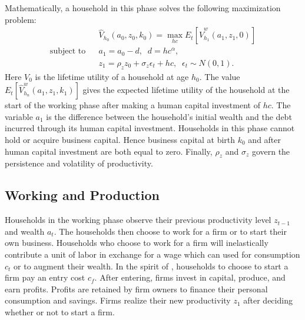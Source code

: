 \documentclass[11pt]{article}
\theoremstyle{definition}
\numberwithin{equation}{section}
\begin{document}
Mathematically, a household in this phase solves the following maximization problem:
\begin{eqnarray}
&&\hat{V}_{h_0}(a_0,z_0,k_0)=\max_{hc} E_t\left[ \hat{V}^w_{h_1}(a_1,z_1,0)\right] \\
\text{subject to} 	&& a_1 = a_0 - d, \;\; d = hc^\alpha, \\
					&& z_1 = \rho_z z_0 + \sigma_z\epsilon_t + hc, \;\; \epsilon_t\sim N(0,1).
\end{eqnarray}
Here $V_0$ is the lifetime utility of a household at age $h_0$. The value $E_t\left[ \hat{V}^w_{h_n}(a_1,z_1,k_1)\right]$ gives the expected lifetime utility of the household at the start of the working phase after making a human capital investment of $hc$. The variable $a_1$ is the difference between the household's initial wealth and the debt incurred through its human capital investment. Households in this phase cannot hold or acquire business capital. Hence business capital at birth $k_0$ and after human capital investment are both equal to zero. Finally, $\rho_z$ and $\sigma_z$ govern the persistence and volatility of productivity.


\subsection{Working and Production}
Households in the working phase observe their previous productivity level $z_{t-1}$ and wealth $a_t$. The households then choose to work for a firm or to start their own business. Households who choose to work for a firm will inelastically contribute a unit of labor in exchange for a wage which can used for consumption $c_t$ or to augment their wealth. In the spirit of \cite{hopenhayn1993job}, households to choose to start a firm pay an entry cost $c_f$. After entering, firms invest in capital, produce, and earn profits. Profits are retained by firm owners to finance their personal consumption and savings. Firms realize their new productivity $z_1$ after deciding whether or not to start a firm. 
\end{document}
